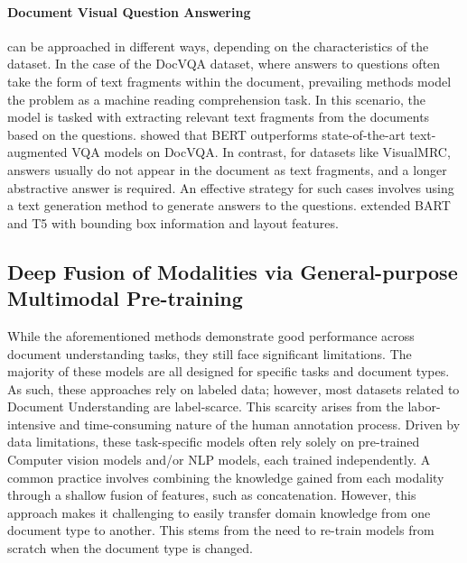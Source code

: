 \paragraph{Document Visual Question Answering} can be approached in different ways, depending on the characteristics of the dataset. In the case of the DocVQA dataset, where answers to questions often take the form of text fragments within the document, prevailing methods model the problem as a machine reading comprehension task. In this scenario, the model is tasked with extracting relevant text fragments from the documents based on the questions. \citet{mathew2021docvqa} showed that BERT outperforms state-of-the-art text-augmented \ac{VQA} models \citep{singh2019towards, hu2020iterative} on DocVQA. In contrast, for datasets like VisualMRC, answers usually do not appear in the document as text fragments, and a longer abstractive answer is required. An effective strategy for such cases involves using a text generation method to generate answers to the questions. \citet{tanaka2021visualmrc} extended BART and T5 with bounding box information and layout features.



\subsection{Deep Fusion of Modalities via General-purpose Multimodal Pre-training}
\label{subsection:chapter2-deep-fusion}

While the aforementioned methods demonstrate good performance across document understanding tasks, they still face significant limitations. The majority of these models are all designed for specific tasks and document types. As such, these approaches rely on labeled data; however, most datasets related to Document Understanding are label-scarce. This scarcity arises from the labor-intensive and time-consuming nature of the human annotation process. Driven by data limitations, these task-specific models often rely solely on pre-trained Computer vision models and/or \ac{NLP} models, each trained independently. A common practice involves combining the knowledge gained from each modality through a shallow fusion of features, such as concatenation. However, this approach makes it challenging to easily transfer domain knowledge from one document type to another. This stems from the need to re-train models from scratch when the document type is changed.

